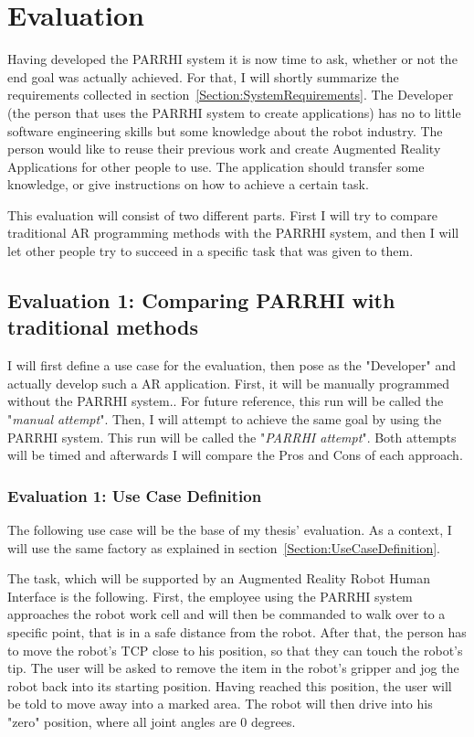 \chapter{Evaluation}\label{Chap:Evaluation}

Having developed the PARRHI system it is now time to ask, whether or not the end goal was actually achieved. For that, I will shortly summarize the requirements collected in section~\ref{Section:SystemRequirements}. The Developer (the person that uses the PARRHI system to create applications) has no to little software engineering skills but some knowledge about the robot industry. The person would like to reuse their previous work and create Augmented Reality Applications for other people to use. The application should transfer some knowledge, or give instructions on how to achieve a certain task.

This evaluation will consist of two different parts. First I will try to compare traditional AR programming methods with the PARRHI system, and then I will let other people try to succeed in a specific task that was given to them. 

\section{Evaluation 1: Comparing PARRHI with traditional methods}

I will first define a use case for the evaluation, then pose as the "Developer" and actually develop such a AR application. First, it will be manually programmed without the PARRHI system.. For future reference, this run will be called the "\textit{manual attempt}". Then, I will attempt to achieve the same goal by using the PARRHI system. This run will be called the "\textit{PARRHI attempt}". Both attempts will be timed and afterwards I will compare the Pros and Cons of each approach.

\subsection{Evaluation 1: Use Case Definition}
The following use case will be the base of my thesis' evaluation. As a context, I will use the same factory as explained in section~\ref{Section:UseCaseDefinition}. 

The task, which will be supported by an Augmented Reality Robot Human Interface is the following. First, the employee using the PARRHI system approaches the robot work cell and will then be commanded to walk over to a specific point, that is in a safe distance from the robot. After that, the person has to move the robot's TCP close to his position, so that they can touch the robot's tip. The user will be asked to remove the item in the robot's gripper and jog the robot back into its starting position. Having reached this position, the user will be told to move away into a marked area. The robot will then drive into his "zero" position, where all joint angles are 0 degrees. 

